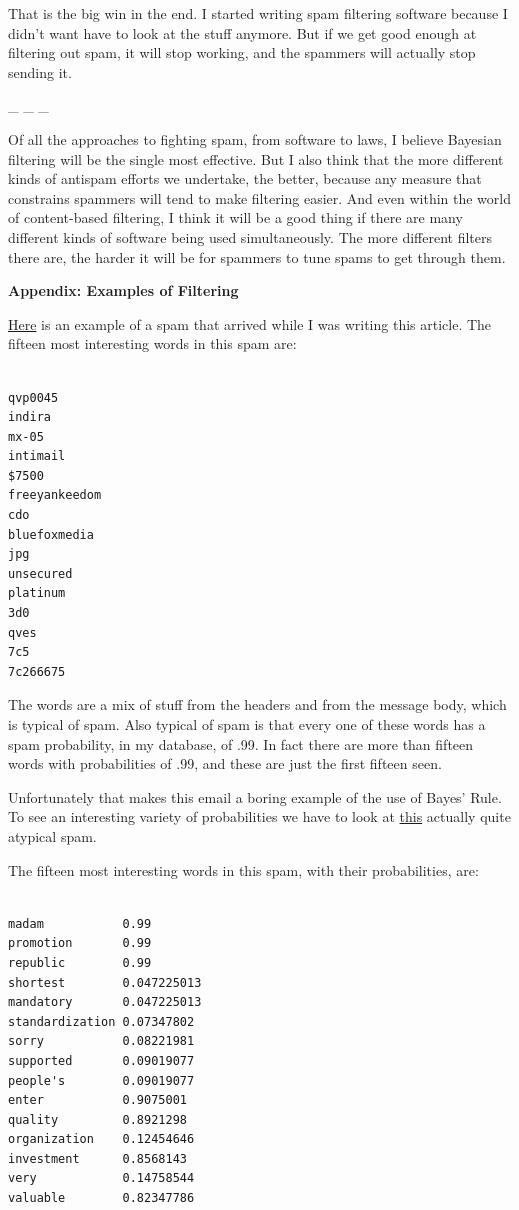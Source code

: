 \documentclass[12pt]{book}
\begin{document}
That is the big win in the end. I started writing spam filtering
software because I didn't want have to look at the stuff anymore. But if
we get good enough at filtering out spam, it will stop working, and the
spammers will actually stop sending it.

\_ \_ \_

Of all the approaches to fighting spam, from software to laws, I believe
Bayesian filtering will be the single most effective. But I also think
that the more different kinds of antispam efforts we undertake, the
better, because any measure that constrains spammers will tend to make
filtering easier. And even within the world of content-based filtering,
I think it will be a good thing if there are many different kinds of
software being used simultaneously. The more different filters there
are, the harder it will be for spammers to tune spams to get through
them.

\textbf{Appendix: Examples of Filtering}

\href{https://sep.turbifycdn.com/ty/cdn/paulgraham/spam1.txt?t=1688221954&}{Here}
is an example of a spam that arrived while I was writing this article.
The fifteen most interesting words in this spam are:

\begin{verbatim}

qvp0045
indira
mx-05
intimail
$7500
freeyankeedom
cdo
bluefoxmedia
jpg
unsecured
platinum
3d0
qves
7c5
7c266675
\end{verbatim}

The words are a mix of stuff from the headers and from the message body,
which is typical of spam. Also typical of spam is that every one of
these words has a spam probability, in my database, of .99. In fact
there are more than fifteen words with probabilities of .99, and these
are just the first fifteen seen.

Unfortunately that makes this email a boring example of the use of
Bayes' Rule. To see an interesting variety of probabilities we have to
look at
\href{https://sep.turbifycdn.com/ty/cdn/paulgraham/spam2.txt?t=1688221954&}{this}
actually quite atypical spam.

The fifteen most interesting words in this spam, with their
probabilities, are:

\begin{verbatim}

madam           0.99
promotion       0.99
republic        0.99
shortest        0.047225013
mandatory       0.047225013
standardization 0.07347802
sorry           0.08221981
supported       0.09019077
people's        0.09019077
enter           0.9075001
quality         0.8921298
organization    0.12454646
investment      0.8568143
very            0.14758544
valuable        0.82347786 
\end{verbatim}
\end{document}
